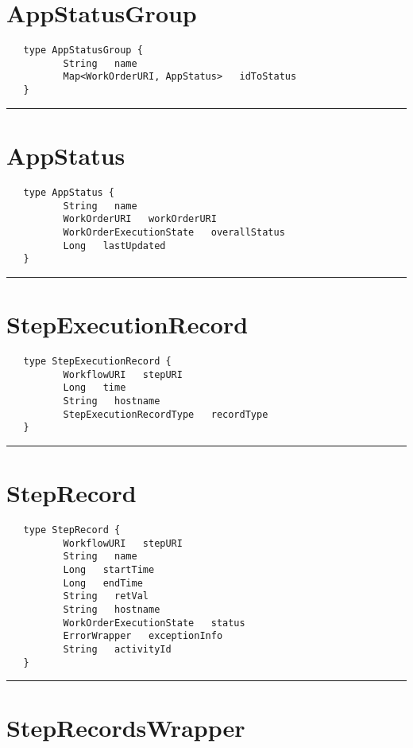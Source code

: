 \section{AppStatusGroup}
\label{type:AppStatusGroup}

\begin{verbatim}
   type AppStatusGroup {
          String   name
          Map<WorkOrderURI, AppStatus>   idToStatus
   }
\end{verbatim}

\rule{15cm}{2pt}
\section{AppStatus}
\label{type:AppStatus}

\begin{verbatim}
   type AppStatus {
          String   name
          WorkOrderURI   workOrderURI
          WorkOrderExecutionState   overallStatus
          Long   lastUpdated
   }
\end{verbatim}

\rule{15cm}{2pt}
\section{StepExecutionRecord}
\label{type:StepExecutionRecord}

\begin{verbatim}
   type StepExecutionRecord {
          WorkflowURI   stepURI
          Long   time
          String   hostname
          StepExecutionRecordType   recordType
   }
\end{verbatim}

\rule{15cm}{2pt}
\section{StepRecord}
\label{type:StepRecord}

\begin{verbatim}
   type StepRecord {
          WorkflowURI   stepURI
          String   name
          Long   startTime
          Long   endTime
          String   retVal
          String   hostname
          WorkOrderExecutionState   status
          ErrorWrapper   exceptionInfo
          String   activityId
   }
\end{verbatim}

\rule{15cm}{2pt}
\section{StepRecordsWrapper}
\label{type:StepRecordsWrapper}

